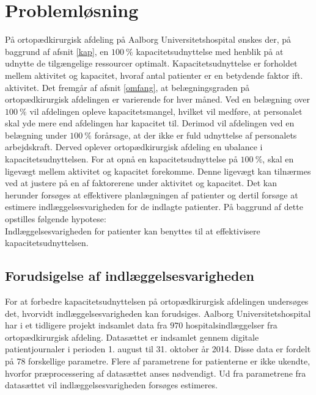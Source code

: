 \chapter{Problemløsning}
På ortopædkirurgisk afdeling på Aalborg Universitetshospital ønskes der, på baggrund af afsnit \ref{kap}, en $100~\%$ kapacitetsudnyttelse med henblik på at udnytte de tilgængelige ressourcer optimalt. Kapacitetsudnyttelse er forholdet mellem aktivitet og kapacitet, hvoraf antal patienter er en betydende faktor ift. aktivitet. 
Det fremgår af afsnit \ref{omfang}, at belægningsgraden på ortopædkirurgisk afdelingen er varierende for hver måned. Ved en belægning over $100~\%$ vil afdelingen opleve kapacitetsmangel, hvilket vil medføre, at personalet skal yde mere end afdelingen har kapacitet til. Derimod vil afdelingen ved en belægning under $100~\%$ forårsage, at der ikke er fuld udnyttelse af personalets arbejdskraft. Derved oplever ortopædkirurgisk afdeling en ubalance i kapacitetsudnyttelsen. 
For at opnå en kapacitetsudnyttelse på $100~\%$, skal en ligevægt mellem aktivitet og kapacitet forekomme. Denne ligevægt kan tilnærmes ved at justere på en af faktorerene under aktivitet og kapacitet\cite{Bames2015}. Det kan herunder forsøges at effektivere planlægningen af patienter og dertil forsøge at estimere indlæggelsesvarigheden for de indlagte patienter. 
På baggrund af dette opstilles følgende hypotese:\\

\noindent
Indlæggelsesvarigheden for patienter kan benyttes til at effektivisere kapacitetsudnyttelsen. 

\section{Forudsigelse af indlæggelsesvarigheden}
For at forbedre kapacitetsudnyttelsen på ortopædkirurgisk afdelingen undersøges det, hvorvidt indlæggelsesvarigheden kan forudsiges.
Aalborg Universitetshospital har i et tidligere projekt indsamlet data fra $970$ hospitalsindlæggelser fra ortopædkirurgisk afdeling. Datasættet er indsamlet gennem digitale patientjournaler i perioden 1. august til 31. oktober år 2014. Disse data er fordelt på 78 forskellige parametre. Flere af parametrene for patienterne er ikke ukendte, hvorfor præprocessering af datasættet anses nødvendigt. Ud fra parametrene fra datasættet vil indlæggelsesvarigheden forsøges estimeres. 



